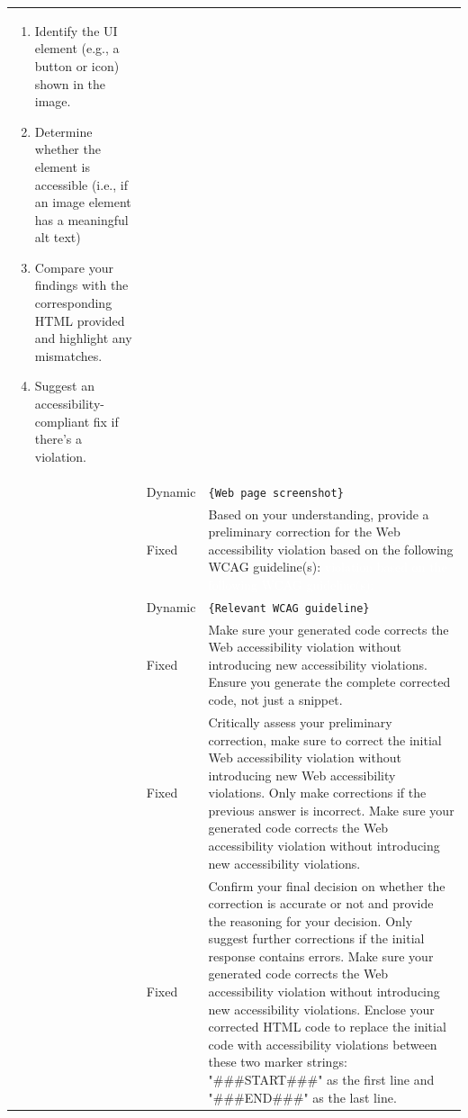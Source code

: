 \documentclass[sigconf, nonacm]{acmart}
\begin{document}
\begin{table}
{\begin{tabular}{p{2.3cm}p{1cm}p{14cm}}
\begin{enumerate}
    \item Identify the UI element (e.g., a button or icon) shown in the image.
    \item  Determine whether the element is accessible (i.e., if an image element has a meaningful alt text)
    \item Compare your findings with the corresponding HTML provided and highlight any mismatches.
    \item Suggest an accessibility-compliant fix if there's a violation.
  \end{enumerate} \\ 
  & Dynamic & \texttt{\{Web page screenshot\}} \\
     \hline
{} 
& Fixed &   Based on your understanding, provide a preliminary correction for the Web accessibility violation based on the following WCAG guideline(s): \textcolor{white}{violation based on the following WCAG guideline(s):}\\ 
& Dynamic & \texttt{\{Relevant WCAG guideline\}} \\ 
&Fixed &  Make sure your generated code corrects the Web accessibility violation without introducing new accessibility violations. Ensure you generate the complete corrected code, not just a snippet. \\ \hline

& Fixed &     Critically assess your preliminary correction, make sure to correct the initial Web accessibility violation without introducing new Web accessibility violations. Only make corrections if the previous answer is incorrect. Make sure your generated code corrects the Web accessibility violation without introducing new accessibility violations.\\ \hline

& Fixed &  Confirm your final decision on whether the correction is accurate or not and provide the reasoning for your decision. Only suggest further corrections if the initial response contains errors. Make sure your generated code corrects the Web accessibility violation without introducing new accessibility violations. Enclose your corrected HTML code to replace the initial code with accessibility violations between these two marker strings: "\#\#\#START\#\#\#" as the first line and "\#\#\#END\#\#\#" as the last line.
  \\ \hline


\end{tabular}}
\end{table}
\end{document}
